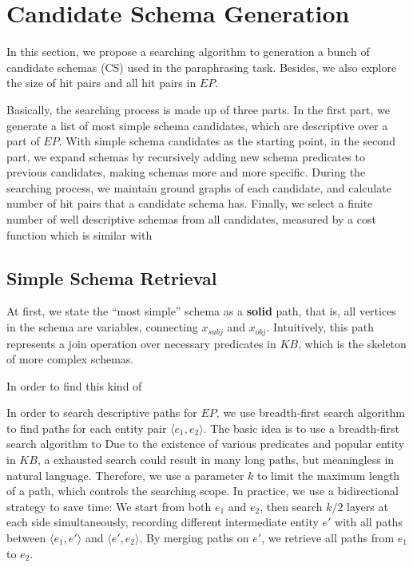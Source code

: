 \section{Candidate Schema Generation}
In this section, we propose a searching algorithm to generation
a bunch of candidate schemas (CS) used in the paraphrasing task.
Besides, we also explore the size of hit pairs and all hit pairs in $EP$.

Basically, the searching process is made up of three parts.
In the first part, we generate a list of most simple schema candidates,
which are descriptive over a part of $EP$.
With simple schema candidates as the starting point, in the second part, we expand schemas by 
recursively adding new schema predicates to previous candidates, making schemas more and more 
specific.
During the searching process, we maintain ground graphs of each candidate, and
calculate number of hit pairs that a candidate schema has.
Finally, we select a finite number of well descriptive schemas from all candidates,
measured by a cost function which is similar with 

\subsection{Simple Schema Retrieval}
At first, we state the ``most simple'' schema as a \textbf{solid} path, that is,
all vertices in the schema are variables, connecting $x_{subj}$ and $x_{obj}$.
Intuitively, this path represents a join operation over necessary predicates in $KB$, 
which is the skeleton of more complex schemas.


In order to find this kind of 

In order to search descriptive paths for $EP$, we use breadth-first search algorithm 
to find paths for each entity pair $\langle e_1, e_2 \rangle$.
The basic idea is to use a breadth-first search algorithm to 
Due to the existence of various predicates and popular entity in $KB$, a exhausted search
could result in many long paths, but meaningless in natural language.
Therefore, we use a parameter $k$ to limit the maximum length of a path, which
controls the searching scope.
In practice, we use a bidirectional strategy to save time:
We start from both $e_1$ and $e_2$, then search $k/2$ layers at each side simultaneously,
recording different intermediate entity $e'$ with all paths between $\langle e_1, e' \rangle$
and $\langle e', e_2 \rangle$.
By merging paths on $e'$, we retrieve all paths from $e_1$ to $e_2$.

